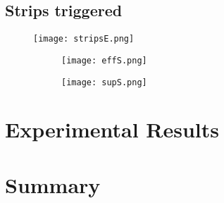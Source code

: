 \subsection{Strips triggered}




\begin{figure}[ht]
	\hspace*{\fill}
	\centering
	\texttt{[image: stripsE.png]}
	\hspace*{\fill}
	\caption{}\label{}
\end{figure}


\begin{figure}[ht]
		\centering
		\hspace*{\fill}
		\begin{subfigure}[b]{0.48\textwidth}
			\centering
			\texttt{[image: effS.png]}
			\caption{}\label{}
		\end{subfigure}
		\hfill
		\begin{subfigure}[b]{0.48\textwidth}
			\centering
			\texttt{[image: supS.png]}
			\caption{}\label{}
		\end{subfigure}
		\hspace*{\fill}
		\caption{}\label{}
\end{figure}




\section{Experimental Results}

\section{Summary}


